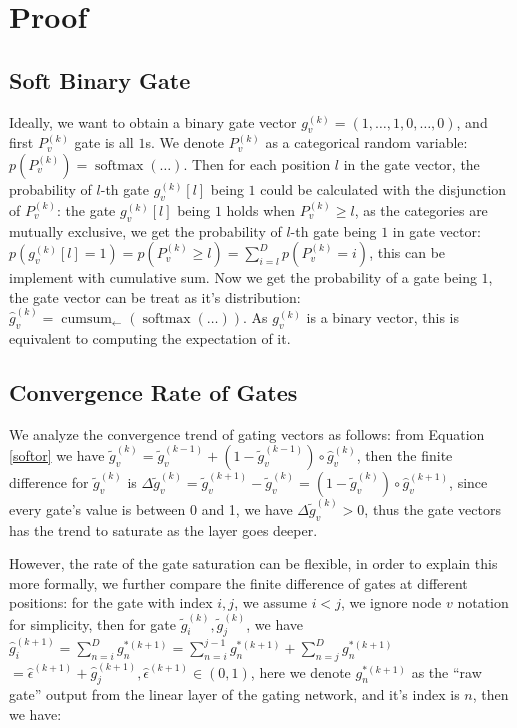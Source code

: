 \documentclass{article}
\begin{document}




\newpage
\appendix

\section{Proof}

\subsection{Soft Binary Gate}
\label{proof}
Ideally, we want to obtain a binary gate vector $g_{v}^{(k)}=(1,\ldots,1,0,\ldots,0)$, and first $P_{v}^{(k)}$ gate is all $1$s. We denote $P_{v}^{(k)}$ as a categorical random variable: $p(P_{v}^{(k)}) = \operatorname{softmax}(\ldots)$. Then for each position $l$ in the gate vector, the probability of $l$-th gate $g_{v}^{(k)}[l]$ being $1$ could be calculated with the disjunction of $P_{v}^{(k)}$: the gate $g_{v}^{(k)}[l]$ being $1$ holds when $P_{v}^{(k)} \geq l$, as the categories are mutually exclusive, we get the probability of $l$-th gate being $1$ in gate vector: $p(g_{v}^{(k)}[l]=1) = p(P_{v}^{(k)} \geq l) = \sum\limits_{i=l}^{D}p(P_{v}^{(k)}=i)$, this can be implement with cumulative sum. Now we get the 
probability of a gate being $1$, the gate vector can be treat as it's distribution: $\hat{g}_{v}^{(k)} = \operatorname{cumsum}_{\leftarrow}(\operatorname{softmax}(\ldots))$. As $g_{v}^{(k)}$ is a binary vector, this is equivalent to computing the expectation of it.

\subsection{Convergence Rate of Gates}
\label{proof_conv_speed}
We analyze the convergence trend of gating vectors as follows: from Equation \ref{softor} we have $\tilde{g}_{v}^{(k)} = \tilde{g}_{v}^{(k-1)} + (1-\tilde{g}_{v}^{(k-1)}) \circ \hat{g}_{v}^{(k)}$, then the finite difference for $\tilde{g}_{v}^{(k)}$ is $\Delta \tilde{g}_{v}^{(k)} = \tilde{g}_{v}^{(k+1)} - \tilde{g}_{v}^{(k)} = (1-\tilde{g}_{v}^{(k)}) \circ \hat{g}_{v}^{(k+1)}$, since every gate's value is between 0 and 1, we have $\Delta \tilde{g}_{v}^{(k)} > 0$, thus the gate vectors has the trend to saturate as the layer goes deeper.

However, the rate of the gate saturation can be flexible, in order to explain this more formally, we further compare the finite difference of gates at different positions: for the gate with index $i,j$, we assume $i<j$, we ignore node $v$ notation for simplicity, then for gate $\tilde{g}_{i}^{(k)}, \tilde{g}_{j}^{(k)}$, we have $\hat{g}_{i}^{(k+1)} = \sum_{n=i}^{D} g_{n}^{*(k+1)} = \sum_{n=i}^{j-1} g_{n}^{*(k+1)} + \sum_{n=j}^{D} g_{n}^{*(k+1)}$ $= \hat{\epsilon}^{(k+1)} + \hat{g}_{j}^{(k+1)}, \hat{\epsilon}^{(k+1)} \in (0,1)$, here we denote $g_{n}^{*(k+1)}$ as the ``raw gate'' output from the linear layer of the gating network, and it's index is $n$, then we have:
\end{document}
